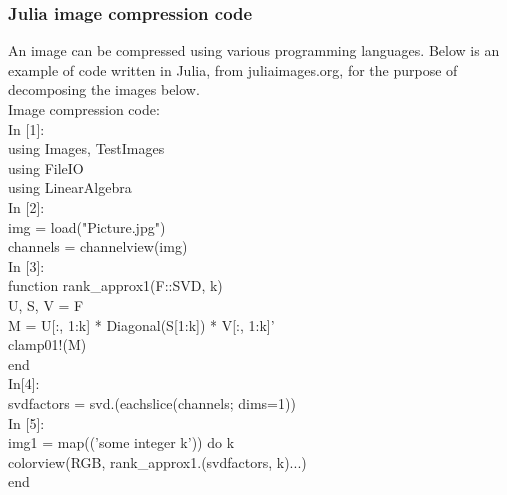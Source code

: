 \documentclass[12pt]{article}
\begin{document}
\subsubsection{Julia image compression code}
An image can be compressed using various programming languages. Below is an example of code written in Julia, from juliaimages.org, for the purpose of decomposing the images below.\\

Image compression code:\\
\newline
{\selectfont
In [1]:\\
using Images, TestImages\\
using FileIO\\
using LinearAlgebra\\
\newline
In [2]:\\
img = load("Picture.jpg")\\
channels = channelview(img)\\
\newline
In [3]:\\
function rank\_approx1(F::SVD, k)\\
    U, S, V = F\\
    M = U[:, 1:k] * Diagonal(S[1:k]) * V[:, 1:k]'\\
    clamp01!(M)\\
end\\
\newline
In[4]:\\
svdfactors = svd.(eachslice(channels; dims=1))\\
\newline
In [5]:\\
img1 = map(('some integer k')) do k\\
    colorview(RGB, rank\_approx1.(svdfactors, k)...)\\
end\\
}
\end{document}
